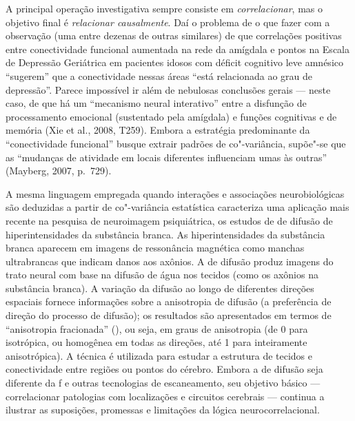 A principal operação investigativa sempre consiste em
\emph{correlacionar}, mas o objetivo final é \emph{relacionar
causalmente}. Daí o problema de o que fazer com a observação (uma entre
dezenas de outras similares) de que correlações positivas entre
conectividade funcional aumentada na rede da amígdala e pontos na Escala
de Depressão Geriátrica em pacientes idosos com déficit cognitivo leve
amnésico ``sugerem'' que a conectividade nessas áreas ``está relacionada
ao grau de depressão''. Parece impossível ir além de nebulosas
conclusões gerais --- neste caso, de que há um ``mecanismo neural
interativo'' entre a disfunção de processamento emocional (sustentado
pela amígdala) e funções cognitivas e de memória (Xie et al., 2008,
T259). Embora a estratégia predominante da ``conectividade funcional''
busque extrair padrões de co"-variância, supõe"-se que as ``mudanças de
atividade em locais diferentes influenciam umas às outras'' (Mayberg,
2007, p.~729).

A mesma linguagem empregada quando interações e associações
neurobiológicas são deduzidas a partir de co"-variância estatística
caracteriza uma aplicação mais recente na pesquisa de neuroimagem
psiquiátrica, os estudos de  de difusão de hiperintensidades da
substância branca. As hiperintensidades da substância branca aparecem em
imagens de ressonância magnética como manchas ultrabrancas que indicam
danos aos axônios. A  de difusão produz imagens do trato neural com
base na difusão de água nos tecidos (como os axônios na substância
branca). A variação da difusão ao longo de diferentes direções espaciais
fornece informações sobre a anisotropia de difusão (a preferência de
direção do processo de difusão); os resultados são apresentados em
termos de ``anisotropia fracionada'' (), ou seja, em graus de
anisotropia (de 0 para isotrópica, ou homogênea em todas as direções,
até 1 para inteiramente anisotrópica). A técnica é utilizada para
estudar a estrutura de tecidos e conectividade entre regiões ou pontos
do cérebro. Embora a  de difusão seja diferente da f e outras
tecnologias de escaneamento, seu objetivo básico --- correlacionar
patologias com localizações e circuitos cerebrais --- continua a
ilustrar as suposições, promessas e limitações da lógica
neurocorrelacional.

